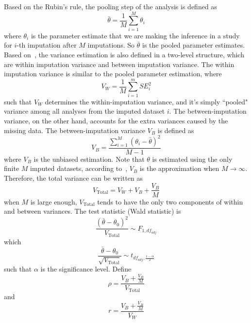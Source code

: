 Based on the Rubin's rule, the pooling step of the analysis is defined as 
\begin{equation} 
    \bar{\theta}=\frac{1}{M}\sum_{i=1}^M\theta_i
\end{equation}
where $\theta_i$ is the parameter estimate that we are making the inference in a study for $i$-th imputation after $M$ imputations. 
So $\bar{\theta}$ is the pooled parameter estimates. 
Based on~\citet{barnard1999miscellanea}, the variance estimation is also defined in a two-level structure, which are within imputation variance and between imputation variance. 
The within imputation variance is similar to the pooled parameter estimation, where 
\begin{equation} 
    V_W=\frac{1}{M}\sum_{i=1}^mSE_i^2
\end{equation}
such that $V_W$ determines the within-imputation variance, and it's simply ``pooled" variance among all analyses from the imputed dataset $i$. 
The between-imputation variance, on the other hand, accounts for the extra variances caused by the missing data. 
The between-imputation variance $V_B$ is defined as 
\begin{equation} 
    V_B=\frac{\sum_{i=1}^M(\theta_i-\bar{\theta})^2}{M-1}
\end{equation}
where $V_B$ is the unbiased estimation. 
Note that $\theta$ is estimated using the only finite $M$ imputed datasets, according to~\citet{van2018flexible}, $V_B$ is the approximation when $M\rightarrow\infty$.
Therefore, the total variance can be written as
\begin{equation} 
    V_{\text{Total}}=V_W+V_B+\frac{V_B}{M}
\end{equation}
when $M$ is large enough, $V_{\text{Total}}$ tends to have the only two components of within and between variances. 
The test statistic (Wald statistic) is 
\begin{equation} 
    \frac{(\bar{\theta}-\theta_0)^2}{V_{\text{Total}}}\sim F_{1,df_{adj}}
\end{equation}
which 
\begin{equation} 
    \frac{\bar{\theta}-\theta_0}{\sqrt{V_{\text{Total}}}}\sim t_{df_{adj}, \frac{1-\alpha}{2}}
\end{equation}
such that $\alpha$ is the significance level. 
Define 
\begin{equation}
    \rho=\frac{V_B+\frac{V_B}{M}}{V_{\text{Total}}}
\end{equation}
and 
\begin{equation}
    r=\frac{V_B+\frac{V_B}{M}}{V_W}
\end{equation}

